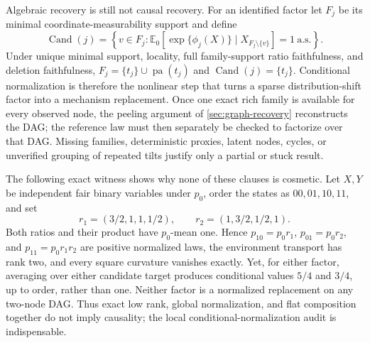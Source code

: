 \documentclass[11pt]{article}
\newcommand{\E}{\mathbb{E}}
\newcommand{\pa}{\operatorname{pa}}
\begin{document}
Algebraic recovery is still not causal recovery.  For an identified factor let
\(F_j\) be its minimal coordinate-measurability support and define
\begin{equation}
\operatorname{Cand}(j)=
\left\{v\in F_j:
\E_0\!\left[\exp\{\phi_j(X)\}\mid X_{F_j\setminus\{v\}}\right]=1
\ \text{a.s.}\right\}.
\label{eq:tomography-candidates}
\end{equation}
Under unique minimal support, locality, full family-support ratio faithfulness,
and deletion
faithfulness, \(F_j=\{t_j\}\cup\pa(t_j)\) and
\(\operatorname{Cand}(j)=\{t_j\}\).  Conditional normalization is therefore
the nonlinear step that turns a sparse distribution-shift factor into a
mechanism replacement.  Once one exact rich family is available for every
observed node, the peeling argument of \cref{sec:graph-recovery} reconstructs
the DAG; the reference law must then separately be checked to factorize over
that DAG.  Missing families, deterministic proxies, latent nodes, cycles, or
unverified grouping of repeated tilts justify only a partial or stuck result.

The following exact witness shows why none of these clauses is cosmetic.  Let
\(X,Y\) be independent fair binary variables under \(p_0\), order the states as
\(00,01,10,11\), and set
\begin{equation}
r_1=(3/2,1,1,1/2),
\qquad
r_2=(1,3/2,1/2,1).
\label{eq:flat-noncausal-cube}
\end{equation}
Both ratios and their product have \(p_0\)-mean one.  Hence
\(p_{10}=p_0r_1\), \(p_{01}=p_0r_2\), and
\(p_{11}=p_0r_1r_2\) are positive normalized laws, the environment transport
has rank two, and every square curvature vanishes exactly.  Yet, for either
factor, averaging over either candidate target produces conditional values
\(5/4\) and \(3/4\), up to order, rather than one.  Neither factor is a
normalized replacement on any two-node DAG.  Thus exact low rank, global
normalization, and flat composition together do not imply causality; the local
conditional-normalization audit is indispensable.
\end{document}
